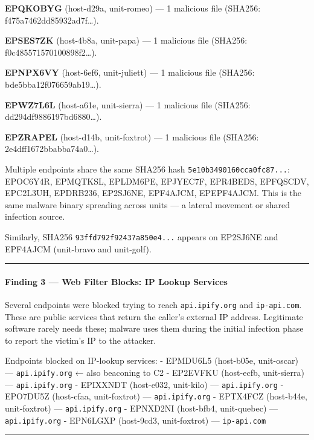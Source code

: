 \documentclass[
]{article}
\begin{document}
\textbf{EPQKOBYG} (host-d29a, unit-romeo) --- 1 malicious file (SHA256:
f475a7462dd85932ad7f\ldots).

\textbf{EPSES7ZK} (host-4b8a, unit-papa) --- 1 malicious file (SHA256:
f0c485571570100898f2\ldots).

\textbf{EPNPX6VY} (host-6ef6, unit-juliett) --- 1 malicious file
(SHA256: bde5bba12f076659ab19\ldots).

\textbf{EPWZ7L6L} (host-a61e, unit-sierra) --- 1 malicious file (SHA256:
dd294df9886197bd6880\ldots).

\textbf{EPZRAPEL} (host-d14b, unit-foxtrot) --- 1 malicious file
(SHA256: 2e4dff1672bbabba74a0\ldots).

Multiple endpoints share the same SHA256 hash
\texttt{5e10b3490160cca0fc87...}: EPOC6Y4R, EPMQTKSL, EPLDM6PE,
EPJYEC7F, EPR4BEDS, EPFQSCDV, EPC2L3UH, EPDRB236, EP2SJ6NE, EPF4AJCM,
EPEPF4AJCM. This is the same malware binary spreading across units --- a
lateral movement or shared infection source.

Similarly, SHA256 \texttt{93ffd792f92437a850e4...} appears on EP2SJ6NE
and EPF4AJCM (unit-bravo and unit-golf).

\begin{center}\rule{0.5\linewidth}{0.5pt}\end{center}

\paragraph{Finding 3 --- Web Filter Blocks: IP Lookup
Services}\label{finding-3-web-filter-blocks-ip-lookup-services}

Several endpoints were blocked trying to reach \texttt{api.ipify.org}
and \texttt{ip-api.com}. These are public services that return the
caller's external IP address. Legitimate software rarely needs these;
malware uses them during the initial infection phase to report the
victim's IP to the attacker.

Endpoints blocked on IP-lookup services: - EPMDU6L5 (host-b05e,
unit-oscar) --- \texttt{api.ipify.org} ← also beaconing to C2 - EP2EVFKU
(host-ecfb, unit-sierra) --- \texttt{api.ipify.org} - EPIXXNDT
(host-e032, unit-kilo) --- \texttt{api.ipify.org} - EPO7DU5Z (host-cfaa,
unit-foxtrot) --- \texttt{api.ipify.org} - EPTX4FCZ (host-b44e,
unit-foxtrot) --- \texttt{api.ipify.org} - EPNXD2NI (host-bfb4,
unit-quebec) --- \texttt{api.ipify.org} - EPN6LGXP (host-9cd3,
unit-foxtrot) --- \texttt{ip-api.com}

\begin{center}\rule{0.5\linewidth}{0.5pt}\end{center}
\end{document}

